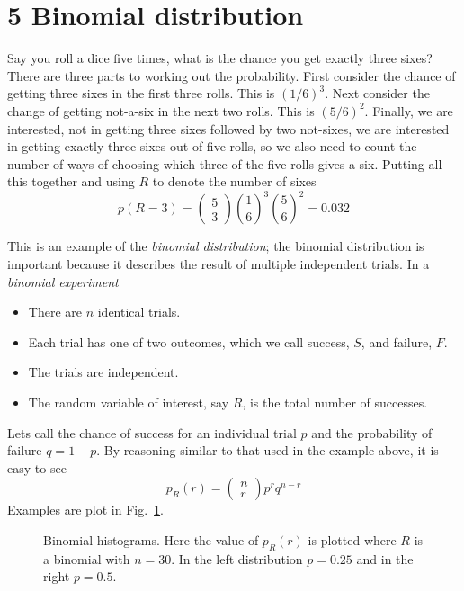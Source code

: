 \documentclass[11pt,a4paper]{scrartcl}
\begin{document}
\section*{5 Binomial distribution}

Say you roll a dice five times, what is the chance you get exactly
three sixes? There are three parts to working out the
probability. First consider the chance of getting three sixes in the
first three rolls. This is $(1/6)^3$. Next consider the change of
getting not-a-six in the next two rolls. This is $(5/6)^2$. Finally,
we are interested, not in getting three sixes followed by two
not-sixes, we are interested in getting exactly three sixes out of
five rolls, so we also need to count the number of ways of choosing
which three of the five rolls gives a six. Putting all this together
and using $R$ to denote the number of sixes
\begin{equation}
p(R=3)=\left(\begin{array}{c}5\\3\end{array}\right)\left(\frac{1}{6}\right)^3\left(\frac{5}{6}\right)^2=0.032
\end{equation}

This is an example of the \textsl{binomial distribution}; the binomial
distribution is important because it describes the result of multiple
independent trials. In a \textsl{binomial experiment}  
\begin{itemize}
\item There are $n$ identical trials.
\item Each trial has one of two outcomes, which we call success, $S$,
  and failure, $F$.
\item The trials are independent.
\item The random variable of interest, say $R$, is the total number of successes.
\end{itemize}
Lets call the chance of success for an individual trial $p$ and the
probability of failure $q=1-p$. By reasoning similar to that used in
the example above, it is easy to see
\begin{equation}
p_R(r)=\left(\begin{array}{c}n\\r\end{array}\right)p^rq^{n-r}
\end{equation}
Examples are plot in Fig.~\ref{fig_binomial}.

\begin{figure}[htb]
\begin{center}

\end{center}
\caption{Binomial histograms. Here the value of $p_R(r)$ is plotted where $R$ is a binomial with $n=30$. In the left distribution $p=0.25$ and in the right $p=0.5$.\label{fig_binomial}}
\end{figure}
\end{document}
